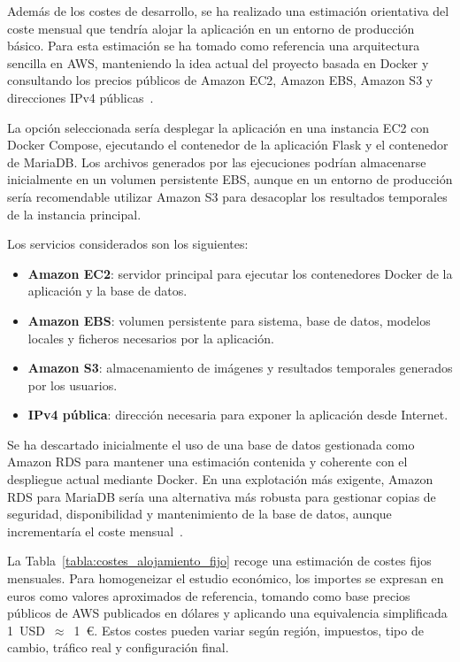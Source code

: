 Además de los costes de desarrollo, se ha realizado una estimación orientativa del coste mensual que tendría alojar la aplicación en un entorno de producción básico. Para esta estimación se ha tomado como referencia una arquitectura sencilla en AWS, manteniendo la idea actual del proyecto basada en Docker y consultando los precios públicos de Amazon EC2, Amazon EBS, Amazon S3 y direcciones IPv4 públicas~\cite{aws_ec2_pricing,aws_ebs_pricing,aws_s3_pricing,aws_public_ipv4_pricing}.

La opción seleccionada sería desplegar la aplicación en una instancia EC2 con Docker Compose, ejecutando el contenedor de la aplicación Flask y el contenedor de MariaDB. Los archivos generados por las ejecuciones podrían almacenarse inicialmente en un volumen persistente EBS, aunque en un entorno de producción sería recomendable utilizar Amazon S3 para desacoplar los resultados temporales de la instancia principal.

Los servicios considerados son los siguientes:

\begin{itemize}
	\item \textbf{Amazon EC2}: servidor principal para ejecutar los contenedores Docker de la aplicación y la base de datos.
	\item \textbf{Amazon EBS}: volumen persistente para sistema, base de datos, modelos locales y ficheros necesarios por la aplicación.
	\item \textbf{Amazon S3}: almacenamiento de imágenes y resultados temporales generados por los usuarios.
	\item \textbf{IPv4 pública}: dirección necesaria para exponer la aplicación desde Internet.
\end{itemize}

Se ha descartado inicialmente el uso de una base de datos gestionada como Amazon RDS para mantener una estimación contenida y coherente con el despliegue actual mediante Docker. En una explotación más exigente, Amazon RDS para MariaDB sería una alternativa más robusta para gestionar copias de seguridad, disponibilidad y mantenimiento de la base de datos, aunque incrementaría el coste mensual~\cite{aws_rds_mariadb_pricing}.

La Tabla~\ref{tabla:costes_alojamiento_fijo} recoge una estimación de costes fijos mensuales. Para homogeneizar el estudio económico, los importes se expresan en euros como valores aproximados de referencia, tomando como base precios públicos de AWS publicados en dólares y aplicando una equivalencia simplificada 1~USD~$\approx$~1~€. Estos costes pueden variar según región, impuestos, tipo de cambio, tráfico real y configuración final.

